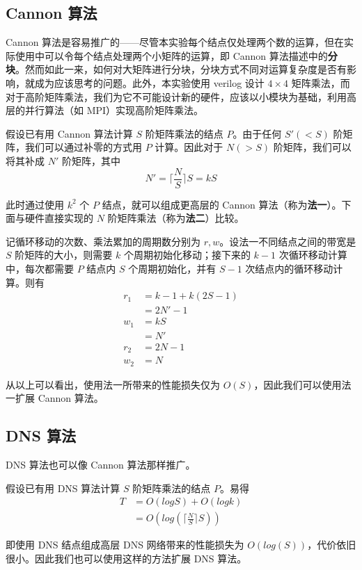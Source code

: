 \documentclass{zjureport-zh}
\begin{document}
\subsection{Cannon 算法}
\par Cannon 算法是容易推广的——尽管本实验每个结点仅处理两个数的运算，但在实际使用中可以令每个结点处理两个小矩阵的运算，即 Cannon 算法描述中的\textbf{分块}。然而如此一来，如何对大矩阵进行分块，分块方式不同对运算复杂度是否有影响，就成为应该思考的问题。此外，本实验使用 verilog 设计 $4 \times 4$ 矩阵乘法，而对于高阶矩阵乘法，我们为它不可能设计新的硬件，应该以小模块为基础，利用高层的并行算法（如 MPI）实现高阶矩阵乘法。
\par 假设已有用 Cannon 算法计算 $S$ 阶矩阵乘法的结点 $P$。由于任何 $S'(<S)$ 阶矩阵，我们可以通过补零的方式用 $P$ 计算。因此对于 $N(>S)$ 阶矩阵，我们可以将其补成 $N'$ 阶矩阵，其中
$$
	N' = \lceil\frac{N}{S}\rceil S = kS
$$
\par 此时通过使用 $k^2$ 个 $P$ 结点，就可以组成更高层的 Cannon 算法（称为\textbf{法一}）。下面与硬件直接实现的 $N$ 阶矩阵乘法（称为\textbf{法二}）比较。
\par 记循环移动的次数、乘法累加的周期数分别为 $r, w$。设法一不同结点之间的带宽是 $S$ 阶矩阵的大小，则需要 $k$ 个周期初始化移动；接下来的 $k-1$ 次循环移动计算中，每次都需要 $P$ 结点内 $S$ 个周期初始化，并有 $S-1$ 次结点内的循环移动计算。则有
\begin{align*}
	r_1 &= k-1 + k(2S - 1) \\
		&= 2N' - 1 \\
	w_1 &= kS \\
		&= N' \\
	r_2 &= 2N-1 \\
	w_2 &= N
\end{align*}

\par 从以上可以看出，使用法一所带来的性能损失仅为 $O(S)$，因此我们可以使用法一扩展 Cannon 算法。

\subsection{DNS 算法}
\par DNS 算法也可以像 Cannon 算法那样推广。
\par 假设已有用 DNS 算法计算 $S$ 阶矩阵乘法的结点 $P$。易得
\begin{align*}
	T &= O(logS) + O(logk) \\
	  &= O(log(\lceil\frac{N}{S}\rceil S))
\end{align*}
\par 即使用 DNS 结点组成高层 DNS 网络带来的性能损失为 $O(log(S))$，代价依旧很小。因此我们也可以使用这样的方法扩展 DNS 算法。
\end{document}
